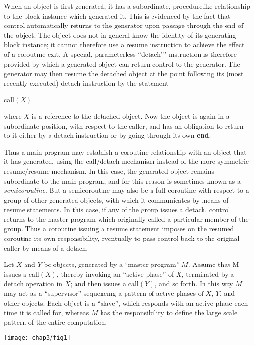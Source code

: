 When an object is first generated, it has a subordinate, procedurelike relationship to the block instance which generated it. This is evidenced by the fact that control automatically returns to the generator upon passage through the end of the object. The object does not in general know the identity of its generating block instance; it cannot therefore use a resume instruction to achieve the effect of a coroutine exit. A special, parameterless ``detach''' instruction is therefore provided by which a generated object can return control to the generator. The generator may then resume the detached object at the point following its (most recently executed) detach instruction by the
statement

\quad call$(X)$

\noindent
where $X$ is a reference to the detached object. Now the object is again in a subordinate position, with respect to the caller, and has an obligation to return to it either by a detach instruction or by going through its own \textbf{end}.

Thus a main program may establish a coroutine relationship with an object that it has generated, using the call/detach mechanism instead of the more symmetric resume$/$resume mechanism. In this case, the generated object remains subordinate to the main program, and for this reason is sometimes known as a \textit{semicoroutine}. But a semicoroutine may also be a full coroutine with respect to a group of other generated objects, with which it communicates by means of resume statements. In this case, if any of the group issues a detach, control returns to the master program which originally called a particular member of the group. Thus a coroutine issuing a resume statement imposes on the resumed coroutine its own responsibility, eventually to pass control back to the original caller by means of a detach.

Let $X$ and $Y$ be objects, generated by a ``master program'' $M$. Assume that M issues a call$(X)$, thereby invoking an ``active phase'' of $X$, terminated by a detach operation in $X$; and then issues a call$(Y)$, and so forth. In this way $M$ may act as a ``supervisor'' sequencing a pattern of active phases of $X$, $Y$, and other objects. Each object is a ``slave'', which responds with an active phase each time it is called for, whereas $M$ has the responsibility to define the large scale pattern of the entire computation.
\begin{center}
	\texttt{[image: chap3/fig1]}
\end{center}

